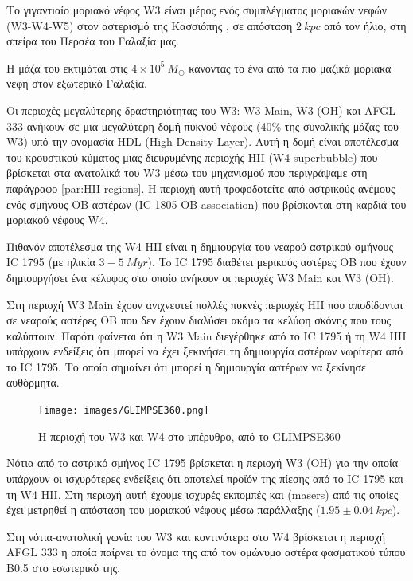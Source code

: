 \documentclass[a4paper,12pt]{memoir}
\newcommand{\e}[1]{\times 10^{#1}}
\begin{document}
Το γιγαντιαίο μοριακό νέφος W3 είναι μέρος ενός συμπλέγματος μοριακών νεφών (W3-W4-W5) στον αστερισμό της Κασσιόπης , σε απόσταση $2 \ kpc$ από τον ήλιο, στη σπείρα του Περσέα του Γαλαξία μας. 

Η μάζα του εκτιμάται στις $4\e{5} \ M_{\odot}$ κάνοντας το ένα από τα πιο μαζικά μοριακά νέφη στον εξωτερικό Γαλαξία.

Οι περιοχές μεγαλύτερης δραστηριότητας του W3: W3 Main, W3 (OH) και AFGL 333 ανήκουν σε μια μεγαλύτερη δομή πυκνού νέφους (40\% της συνολικής μάζας του W3) υπό την ονομασία HDL (High Density Layer). Αυτή η δομή είναι αποτέλεσμα του κρουστικού κύματος μιας διευρυμένης περιοχής HII (W4 superbubble) που βρίσκεται στα ανατολικά του W3 μέσω του μηχανισμού που περιγράψαμε στη παράγραφο \ref{par:HII regions}. Η περιοχή αυτή τροφοδοτείτε από αστρικούς ανέμους ενός σμήνους OB αστέρων (IC 1805 OB association) που βρίσκονται στη καρδιά του μοριακού νέφους W4.

Πιθανόν αποτέλεσμα της W4 HII είναι η δημιουργία του νεαρού αστρικού σμήνους IC 1795 (με ηλικία $3-5 \ Myr$). To IC 1795 διαθέτει μερικούς αστέρες OB που έχουν δημιουργήσει ένα κέλυφος στο οποίο ανήκουν οι περιοχές W3 Main και W3 (OH).

Στη περιοχή W3 Main έχουν ανιχνευτεί πολλές πυκνές περιοχές HII που αποδίδονται σε νεαρούς αστέρες OB που δεν έχουν διαλύσει ακόμα τα κελύφη σκόνης που τους καλύπτουν. Παρότι φαίνεται ότι η W3 Main διεγέρθηκε από το IC 1795 ή τη W4 HII υπάρχουν ενδείξεις ότι μπορεί να έχει ξεκινήσει τη δημιουργία αστέρων νωρίτερα από το IC 1795. Το οποίο σημαίνει ότι μπορεί η δημιουργία αστέρων να ξεκίνησε αυθόρμητα.


\begin{figure}[h!]
	\centering
	\texttt{[image: images/GLIMPSE360.png]}
	\caption{Η περιοχή του W3 και W4 στο υπέρυθρο, από το GLIMPSE360}
\end{figure}

Νότια από το αστρικό σμήνος IC 1795 βρίσκεται η περιοχή W3 (OH) για την οποία υπάρχουν οι ισχυρότερες ενδείξεις ότι αποτελεί προϊόν της πίεσης από το IC 1795 και τη  W4 HII. Στη περιοχή αυτή έχουμε ισχυρές εκπομπές  και  (masers) από τις οποίες έχει μετρηθεί η απόσταση του μοριακού νέφους μέσω παράλλαξης ($1.95 \pm 0.04 \ kpc$).

Στη νότια-ανατολική γωνία του W3 και κοντινότερα στο W4 βρίσκεται η περιοχή AFGL 333 η οποία παίρνει το όνομα της από τον ομώνυμο αστέρα φασματικού τύπου B0.5 στο εσωτερικό της. 
\end{document}
